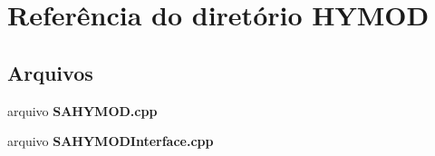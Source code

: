 \section{Referência do diretório H\+Y\+M\+OD}
\label{dir_721504042c246336eaef1e2d8290884b}
\subsection*{Arquivos}
\begin{DoxyCompactItemize}
\item 
arquivo {\bf S\+A\+H\+Y\+M\+O\+D.\+cpp}
\item 
arquivo {\bf S\+A\+H\+Y\+M\+O\+D\+Interface.\+cpp}
\end{DoxyCompactItemize}
